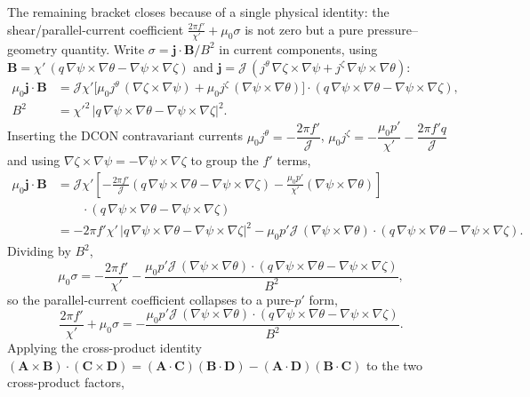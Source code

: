 \documentclass[10pt,a4paper]{article}
\numberwithin{equation}{section}
\begin{document}
The remaining bracket closes because of a single physical identity: the
shear/parallel-current coefficient $\tfrac{2\pi f'}{\chi'}+\mu_0\sigma$ is not
zero but a pure pressure--geometry quantity.  Write
$\sigma=\mathbf j\cdot\mathbf B/B^2$ in current components, using
$\mathbf B=\chi'\,(q\,\nabla\psi\times\nabla\theta-\nabla\psi\times\nabla\zeta)$ and
$\mathbf j=\mathcal J\,(j^\theta\,\nabla\zeta\times\nabla\psi+j^\zeta\,\nabla\psi\times\nabla\theta)$:
\begin{equation}
\begin{aligned}
\mu_0\mathbf j\cdot\mathbf B
&=\mathcal J\chi'\big[\mu_0 j^\theta\,(\nabla\zeta\times\nabla\psi)+\mu_0 j^\zeta\,(\nabla\psi\times\nabla\theta)\big]
\cdot(q\,\nabla\psi\times\nabla\theta-\nabla\psi\times\nabla\zeta),\\
B^2&=\chi'^2\,|q\,\nabla\psi\times\nabla\theta-\nabla\psi\times\nabla\zeta|^2.
\end{aligned}
\end{equation}
Inserting the DCON contravariant currents
$\mu_0 j^\theta=-\dfrac{2\pi f'}{\mathcal J}$,
$\mu_0 j^\zeta=-\dfrac{\mu_0p'}{\chi'}-\dfrac{2\pi f'q}{\mathcal J}$
and using $\nabla\zeta\times\nabla\psi=-\nabla\psi\times\nabla\zeta$ to group the $f'$ terms,
\begin{equation}
\begin{aligned}
\mu_0\mathbf j\cdot\mathbf B
&=\mathcal J\chi'\left[-\frac{2\pi f'}{\mathcal J}(q\,\nabla\psi\times\nabla\theta-\nabla\psi\times\nabla\zeta)-\frac{\mu_0p'}{\chi'}(\nabla\psi\times\nabla\theta)\right]\\
&\qquad\cdot(q\,\nabla\psi\times\nabla\theta-\nabla\psi\times\nabla\zeta)\\
&=-2\pi f'\chi'\,|q\,\nabla\psi\times\nabla\theta-\nabla\psi\times\nabla\zeta|^2
-\mu_0p'\mathcal J\,(\nabla\psi\times\nabla\theta)\cdot(q\,\nabla\psi\times\nabla\theta-\nabla\psi\times\nabla\zeta).
\end{aligned}
\end{equation}
Dividing by $B^2$,
\begin{equation}
\mu_0\sigma=-\frac{2\pi f'}{\chi'}-\frac{\mu_0p'\mathcal J\,(\nabla\psi\times\nabla\theta)\cdot(q\,\nabla\psi\times\nabla\theta-\nabla\psi\times\nabla\zeta)}{B^2},
\end{equation}
so the parallel-current coefficient collapses to a pure-$p'$ form,
\begin{equation}
\frac{2\pi f'}{\chi'}+\mu_0\sigma
=-\frac{\mu_0p'\mathcal J\,(\nabla\psi\times\nabla\theta)\cdot(q\,\nabla\psi\times\nabla\theta-\nabla\psi\times\nabla\zeta)}{B^2}.
\end{equation}
Applying the cross-product identity
$(\mathbf A\times\mathbf B)\cdot(\mathbf C\times\mathbf D)=(\mathbf A\cdot\mathbf C)(\mathbf B\cdot\mathbf D)-(\mathbf A\cdot\mathbf D)(\mathbf B\cdot\mathbf C)$
to the two cross-product factors,
\end{document}
